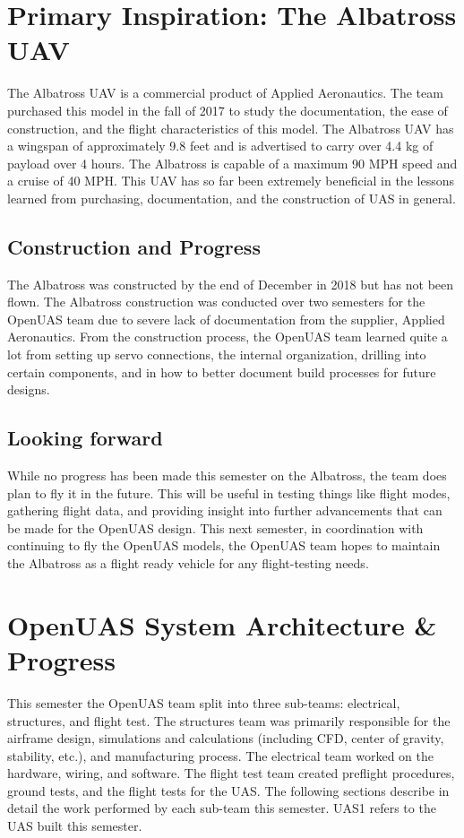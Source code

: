 \documentclass{article}
\begin{document}
\section{Primary Inspiration: The Albatross UAV}
\noindent The Albatross UAV is a commercial product of Applied Aeronautics. The team purchased this model in the fall of 2017 to study the documentation, the ease of construction, and the flight characteristics of this model. The Albatross UAV has a wingspan of approximately 9.8 feet and is advertised to carry over 4.4 kg of payload over 4 hours. The Albatross is capable of a maximum 90 MPH speed and a cruise of 40 MPH. This UAV has so far been extremely beneficial in the lessons learned from purchasing, documentation, and the construction of UAS in general. 

\subsection{Construction and Progress}
The Albatross was constructed by the end of December in 2018 but has not been flown. The Albatross construction was conducted over two semesters for the OpenUAS team due to severe lack of documentation from the supplier, Applied Aeronautics. From the construction process, the OpenUAS team learned quite a lot from setting up servo connections, the internal organization, drilling into certain components, and in how to better document build processes for future designs. 


\subsection{Looking forward}

While no progress has been made this semester on the Albatross, the team does plan to fly it in the future. This will be useful in testing things like flight modes, gathering flight data, and providing insight into further advancements that can be made for the OpenUAS design. This next semester, in coordination with continuing to fly the OpenUAS models, the OpenUAS team hopes to maintain the Albatross as a flight ready vehicle for any flight-testing needs. 

\section{OpenUAS System Architecture \& Progress}
This semester the OpenUAS team split into three sub-teams: electrical, structures, and flight test. The structures team was primarily responsible for the airframe design, simulations and calculations (including CFD, center of gravity, stability, etc.), and manufacturing process. The electrical team worked on the hardware, wiring, and software. The flight test team created preflight procedures, ground tests, and the flight tests for the UAS. The following sections describe in detail the work performed by each sub-team this semester. UAS1 refers to the UAS built this semester.  
\end{document}
